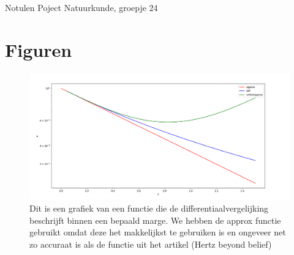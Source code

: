 \documentclass[11pt,a4paper]{article}
\begin{document}
\begin{Minutes}{Notulen Poject Natuurkunde, groepje 24}
\section{Figuren}
\begin{figure}[h]
    \centering
    \includegraphics[width=0.5\linewidth]{Schermafbeelding 2025-06-20 103839.png}
    \caption{Dit is een grafiek van een functie die de differentiaalvergelijking beschrijft binnen een bepaald marge. We hebben de approx functie gebruikt omdat deze het makkelijkst te gebruiken is en ongeveer net zo accuraat is als de functie uit het artikel (Hertz beyond belief)}
    \label{fig:enter-label}
\end{figure}

\end{Minutes}
\end{document}
